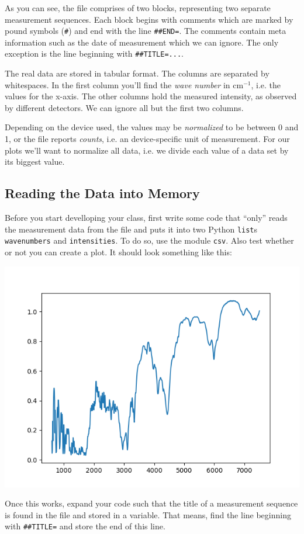 \documentclass[
	english,
	fontsize=10pt,
	parskip=half,
	titlepage=true,
	DIV=12
]{scrartcl}
\newcommand*{\inPy}[1]{\texttt{#1}}
\newcommand*{\ie}{i.\;e. }
\begin{document}
As you can see, the file comprises of two blocks, representing two separate measurement sequences. Each block begins with comments which are marked by pound symbols  (\texttt{\#}) and end with the line \texttt{\#\#END=}. The comments contain meta information such as the date of measurement which we can ignore. The only exception is the line beginning with \texttt{\#\#TITLE=...}.

The real data are stored in tabular format. The columns are separated by whitespaces. In the first column you'll find the \emph{wave number} in $\text{cm}^{-1}$, \ie the values for the x-axis. The other columns hold the measured intensity, as observed by different detectors. We can ignore all but the first two columns.

Depending on the device used, the values may be \emph{normalized} to be between 0 and 1, or the file reports \emph{counts}, \ie an device-specific unit of measurement. For our plots we'll want to normalize all data, \ie we divide each value of a data set by its biggest value.

\subsection{Reading the Data into Memory}
Before you start develloping your class, first write some code that \enquote{only} reads the measurement data from the file and puts it into two Python \inPy{list}s \texttt{wavenumbers} and \texttt{intensities}. To do so, use the module \texttt{csv}. Also test whether or not you can create a plot. It should look something like this:

\begin{center}
	\includegraphics[width=.6\linewidth]{./spectrum-pre}
\end{center}

Once this works, expand your code such that the title of a measurement sequence is found in the file and stored in a variable. That means, find the line beginning with  \texttt{\#\#TITLE=} and store the end of this line.
\end{document}
